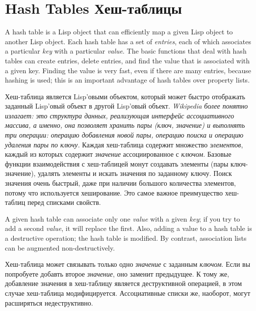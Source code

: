 
\clearpage\def\pagestatus{FINAL PROOF}

\chapter{Hash Tables Хеш-таблицы}
\label{HASH}

A hash table is a Lisp object that can efficiently map a given
Lisp object to another Lisp object.
Each hash table has a set of \emph{entries}, each of which associates a
particular \emph{key} with a particular \emph{value}.  The basic functions
that deal with hash tables can create entries, delete entries, and find
the value that is associated with a given key.  Finding the value is
very fast, even if there are many entries, because hashing is used; this
is an important advantage of hash tables over property lists.

Хеш-таблица является Lisp'овыми объектом, который может быстро отображать
заданный Lisp'овый объект в другой Lisp'овый объект. 
\emph{Wikipedia более понятно излагает: это структура данных, реализующая интерфейс
ассоциативного массива, а именно, она позволяет хранить пары (ключ, значение) и
выполнять три операции: операцию добавления новой пары, операцию поиска и
операцию удаления пары по ключу.}
Каждая хеш-таблица содержит множество \emph{элементов}, каждый из которых
содержит \emph{значение} ассоциированное с \emph{ключом}. Базовые функции
взаимодействия с хеш-таблицей монут создавать элементы (пары ключ-значение),
удалять элементы и искать значения по заданному ключу. Поиск значения очень
быстрый, даже при наличии большого количества элементов, потому что используется
хеширование. Это самое важное преимущество хеш-таблиц перед списками свойств.

A given hash table can associate only one \emph{value} with a given
\emph{key}; if you try to add a second \emph{value}, it will replace the
first.  Also, adding a value to a hash table is a destructive operation;
the hash table is modified.  By contrast, association lists can be
augmented non-destructively.

Хеш-таблица может связывать только одно \emph{значение} с заданным
\emph{ключом}. Если вы попробуете добавть второе \emph{значение}, оно заменит
предыдущее. К тому же, добавление значения в хеш-таблицу является деструктивной
операцией, в этом случае хеш-таблица модифицируется. Ассоциативные списки же,
наоборот, могут расширяться недеструктивно.


